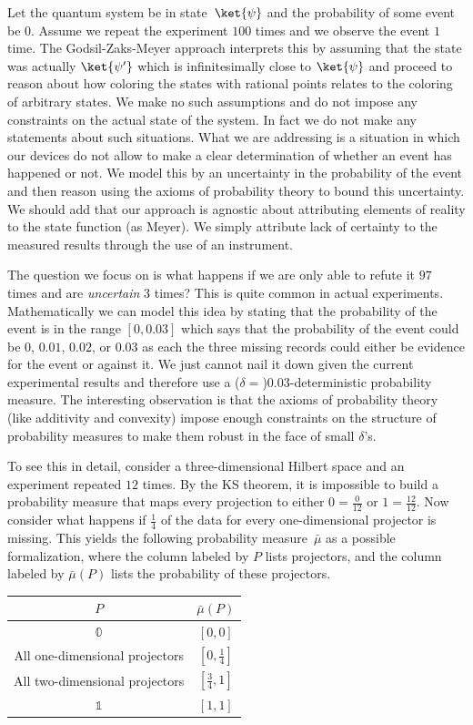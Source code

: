 \documentclass[english,reprint, aps, prl,superscriptaddress, showpacs,
showkeys, longbibliography, amsmath, amssymb, floatfix]{revtex4-1}
\theoremstyle{plain}
\theoremstyle{definition}
\newcommand{\imposs}{\ensuremath{\left[0,0\right]}}
\newcommand{\necess}{\ensuremath{\left[1,1\right]}}
\begin{document}
Let the quantum system be in state~$\ket{\psi}$ and the probability
of some event  be $0$. Assume we repeat the experiment $100$ times
and we observe the event $1$ time. The Godsil-Zaks-Meyer approach
interprets this by assuming that the state was actually $\ket{\psi'}$
which is infinitesimally close to $\ket{\psi}$ and proceed to reason
about how coloring the states with rational points relates to the
coloring of arbitrary states. We make no such assumptions and do not
impose any constraints on the actual state of the system. In fact
we do not make any statements about such situations. What we are addressing
is a situation in which our devices do not allow to make a clear determination
of whether an event has happened or not. We model this by an uncertainty
in the probability of the event and then reason using the axioms of
probability theory to bound this uncertainty. We should add that our
approach is agnostic about attributing elements of reality to the
state function (as Meyer). We simply attribute lack of certainty to
the measured results through the use of an instrument. 

The question we focus on is what happens if we are only able to refute
it $97$ times and are \emph{uncertain} $3$ times? This is quite
common in actual experiments. Mathematically we can model this idea
by stating that the probability of the event is in the range $\left[0,0.03\right]$
which says that the probability of the event could be $0$, $0.01$,
$0.02$, or $0.03$ as each the three missing records could either
be evidence for the event or against it. We just cannot nail it down
given the current experimental results and therefore use a ($\delta=$)$0.03$-deterministic
probability measure. The interesting observation is that the axioms
of probability theory (like additivity and convexity) impose enough
constraints on the structure of probability measures to make them
robust in the face of small $\delta$'s.

To see this in detail, consider a three-dimensional Hilbert space
and an experiment repeated $12$ times. By the KS theorem, it is impossible
to build a probability measure that maps every projection to either
$0=\frac{0}{12}$ or $1=\frac{12}{12}$. Now consider what happens
if $\frac{1}{4}$ of the data for every one-dimensional projector
is missing. This yields the following probability measure~$\bar{\mu}$
as a possible formalization, where the column labeled by $P$ lists
projectors, and the column labeled by $\bar{\mu}\left(P\right)$ lists
the probability of these projectors.
\begin{center}
\begin{tabular}{cc}
\toprule 
\addlinespace
$P$  & $\bar{\mu}\left(P\right)$\tabularnewline
\midrule
\midrule 
\addlinespace
$\mathbb{0}$ & $\imposs$\tabularnewline
\midrule 
\addlinespace
All one-dimensional projectors & $\left[0,\tfrac{1}{4}\right]$\tabularnewline
\midrule 
\addlinespace
All two-dimensional projectors & $\left[\tfrac{3}{4},1\right]$\tabularnewline
\midrule 
\addlinespace
$\mathbb{1}$ & $\necess$\tabularnewline
\bottomrule
\end{tabular}
\par\end{center}
\end{document}
